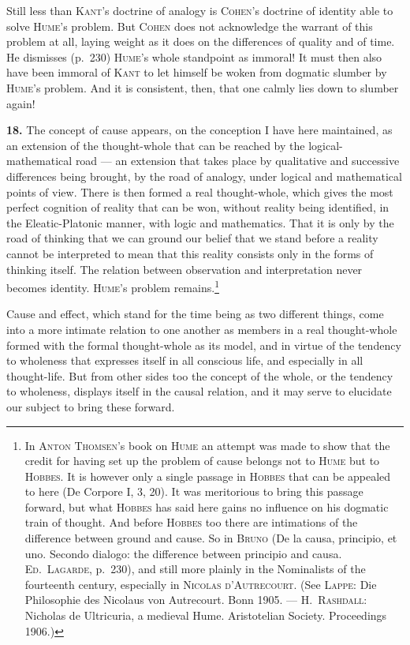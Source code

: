 \documentclass[12pt]{book}
\newcommand{\hnum}[1]{\textbf{#1.}\enspace}
\begin{document}
Still less than \textsc{Kant}'s doctrine of analogy is \textsc{Cohen}'s doctrine of
identity able to solve \textsc{Hume}'s problem. But \textsc{Cohen} does not
acknowledge the warrant of this problem at all, laying weight as it does on the
differences of quality and of time. He dismisses (p.\ 230) \textsc{Hume}'s whole
standpoint as immoral! It must then also have been immoral of \textsc{Kant} to let
himself be woken from dogmatic slumber by \textsc{Hume}'s problem. And it is
consistent, then, that one calmly lies down to slumber again!

\hnum{18} The concept of cause appears, on the conception I have here maintained,
as an extension of the thought-whole that can be reached by the
logical-mathematical road --- an extension that takes place by qualitative and
successive differences being brought, by the road of analogy, under logical and
mathematical points of view. There is then formed a real thought-whole, which
gives the most perfect cognition of reality that can be won, without reality being
identified, in the Eleatic-Platonic manner, with logic and mathematics. That it is
only by the road of thinking that we can ground our belief that we stand before a
reality cannot be interpreted to mean that this reality consists only in the forms
of thinking itself. The relation between observation and interpretation never
becomes identity. \textsc{Hume}'s problem
remains.\footnote{In \textsc{Anton Thomsen}'s book on \textsc{Hume} an attempt was
made to show that the credit for having set up the problem of cause belongs not to
\textsc{Hume} but to \textsc{Hobbes}. It is however only a single passage in
\textsc{Hobbes} that can be appealed to here (De Corpore I, 3, 20). It was
meritorious to bring this passage forward, but what \textsc{Hobbes} has said here
gains no influence on his dogmatic train of thought. And before \textsc{Hobbes} too
there are intimations of the difference between ground and cause. So in
\textsc{Bruno} (De la causa, principio, et uno. Secondo dialogo: the difference
between principio and causa. \textsc{Ed.\ Lagarde}, p.\ 230), and still more plainly
in the Nominalists of the fourteenth century, especially in \textsc{Nicolas
d'Autrecourt}. (See \textsc{Lappe}: Die Philosophie des Nicolaus von Autrecourt.
Bonn 1905. --- \textsc{H.\ Rashdall}: Nicholas de Ultricuria, a medieval Hume.
Aristotelian Society. Proceedings 1906.)}

Cause and effect, which stand for the time being as two different things, come into
a more intimate relation to one another as members in a real thought-whole formed
with the formal thought-whole as its model, and in virtue of the tendency to
wholeness that expresses itself in all conscious life, and especially in all
thought-life. But from other sides too the concept of the whole, or the tendency to
wholeness, displays itself in the causal relation, and it may serve to elucidate our
subject to bring these forward.
\end{document}
